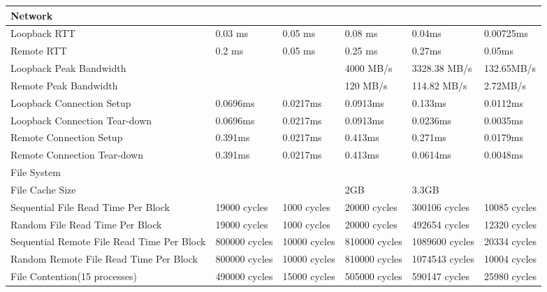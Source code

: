 \small
\begin{center}
\begin{tabular}{| p{4cm} | p{2cm} | p{2cm} | p{2cm} | p{2.5cm} | p{2cm}} 

\hline 
Network & & & & & \\
\hline
Loopback RTT & 0.03 ms & 0.05 ms& 0.08 ms & 0.04ms & 0.00725ms \\
Remote RTT & 0.2 ms& 0.05 ms & 0.25 ms & 0.27ms & 0.05ms\\
Loopback Peak Bandwidth & & & 4000 MB/s & 3328.38 MB/s & 132.65MB/s\\
Remote Peak Bandwidth & & &  120 MB/s  & 114.82 MB/s & 2.72MB/s\\
Loopback Connection Setup & 0.0696ms & 0.0217ms & 0.0913ms & 0.133ms & 0.0112ms \\
Loopback Connection Tear-down & 0.0696ms & 0.0217ms & 0.0913ms & 0.0236ms & 0.0035ms \\
Remote Connection Setup & 0.391ms & 0.0217ms & 0.413ms & 0.271ms & 0.0179ms \\
Remote Connection Tear-down & 0.391ms & 0.0217ms & 0.413ms & 0.0614ms & 0.0048ms \\

\hline 
File System& & & & \\
\hline
File Cache Size & & & 2GB & 3.3GB \\ 
Sequential File Read Time Per Block& 19000 cycles & 1000 cycles& 20000 cycles& 300106 cycles & 10085 cycles\\
Random File Read Time Per Block& 19000 cycles& 1000 cycles& 20000 cycles& 492654 cycles & 12320 cycles \\
Sequential Remote File Read Time Per Block& 800000 cycles& 10000 cycles& 810000 cycles& 1089600 cycles & 20334 cycles\\
Random Remote File Read Time Per Block& 800000 cycles& 10000 cycles& 810000 cycles& 1074543 cycles & 10004 cycles\\
File Contention(15 processes) & 490000 cycles& 15000 cycles& 505000 cycles& 590147 cycles & 25980 cycles \\

\end{tabular}
\end{center}